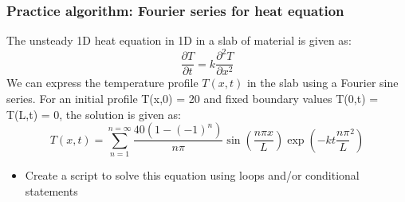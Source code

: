 \begin{frame}[fragile]
  \frametitle{Practice algorithm: Fourier series for heat equation}
  The unsteady 1D heat equation in 1D in a slab of material is given as:
  \[
     \frac{\partial T}{\partial t} = k\frac{\partial^2 T}{\partial x^2}
  \]
 We can express the temperature profile $T(x,t)$ in the slab using a Fourier sine series. For an initial profile T(x,0) = 20 and fixed boundary values T(0,t) = T(L,t) = 0, the solution is given as:
  \[
     T(x,t) = \sum_{n=1}^{n=\infty}\frac{40(1-(-1)^n)}{n\pi}  \sin\left(\frac{n\pi x}{L}\right) \exp\left(-kt\frac{n \pi}{L}^2\right)
  \]
  \begin{itemize}
      \item Create a script to solve this equation using loops and/or conditional statements
  \end{itemize}
 \end{frame}
 
 
 
 
 
 
 
 
